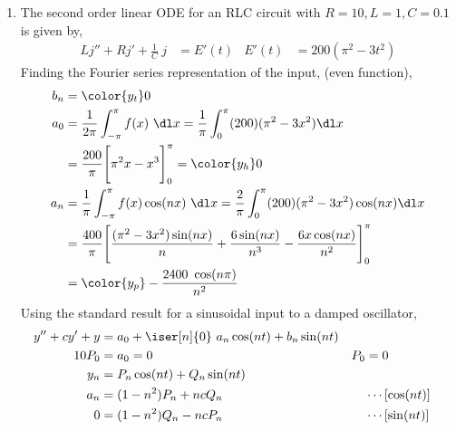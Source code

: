 \begin{enumerate}
    \item The second order linear ODE for an RLC circuit with $ R = 10, L = 1, C = 0.1 $
          is given by,
          \begin{align}
              Lj'' + Rj' + \frac{1}{C}\ j & = E'(t)             &
              E'(t)                       & = 200(\pi^2 - 3t^2)
          \end{align}
          Finding the Fourier series representation of the input, (even function),
          \begin{align}
              b_n & = \color{y_t} 0                                             \\
              a_0 & = \frac{1}{2\pi} \int_{-\pi}^{\pi} f(x)\ \dl x
              = \frac{1}{\pi} \int_{0}^{\pi} (200)(\pi^2 - 3x^2) \dl x          \\
                  & = \frac{200}{\pi}\Bigg[ \pi^2 x - x^3 \Bigg]_{0}^{\pi}
              = \color{y_h} 0                                                   \\
              a_n & = \frac{1}{\pi} \int_{-\pi}^{\pi} f(x) \cos(nx)\ \dl x
              = \frac{2}{\pi} \int_{0}^{\pi} (200)(\pi^2 - 3x^2) \cos(nx) \dl x \\
                  & = \frac{400}{\pi}\Bigg[ \frac{(\pi^2 - 3x^2)\sin(nx)}{n} +
              \frac{6\sin(nx)}{n^3} - \frac{6x\cos(nx)}{n^2} \Bigg]_{0}^{\pi}   \\
                  & = \color{y_p} -\frac{2400\ \cos(n\pi)}{n^2}
          \end{align}
          Using the standard result for a sinusoidal input to a damped oscillator,
          \begin{align}
              y'' + cy' + y & = a_0 + \iser[n]{0}\ a_n \cos(nt) + b_n \sin(nt)   \\
              10P_0         & = a_0 = 0                                        &
              P_0           & = 0                                                \\
              y_n           & = P_n \cos(nt) + Q_n\sin(nt)                       \\
              a_n           & = (1 - n^2)P_n + nc Q_n                          &
                            & \cdots[\cos(nt)]                                   \\
              0             & = (1 - n^2)Q_n - nc P_n                          &
                            & \cdots[\sin(nt)]                                   \\

\end{align}
\end{enumerate}
